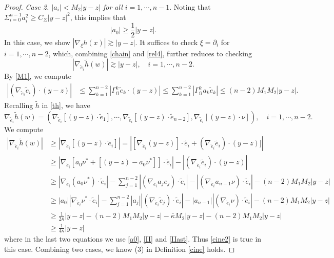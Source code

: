 \documentclass[11pt,a4paper,reqno]{amsart}
\newcommand{\1}{\mathbf{1}}
\numberwithin{equation}{section}
\theoremstyle{plain}
\theoremstyle{definition}
\theoremstyle{remark}
\begin{document}
\begin{proof}
\medskip
\emph{Case 2. $|a_i| < M_2|y-z|$ for all $i=1,\cdots, n-1$}. Noting that $\Sigma_{i=0}^{n-1}a_i^2 \ge C_\Sigma |y-z|^2$, this implies that
\begin{equation}\label{a0}
  |a_0| \ge \frac12|y-z|.
\end{equation}
In this case, we show $|\nabla_\xi h(x)|\gtrsim |y-z|$. It suffices to check $\xi = \partial_i$ for $i=1, \cdots, n-2$, which, combining \eqref{chain} and \eqref{rel4}, further reduces to checking
$$   |\nabla_{\tilde e_i} \tilde h(w)|\gtrsim |y-z|, \quad  i= 1, \cdots,  n-2.   $$
By \eqref{M1}, we compute
\begin{align*}
  |(\nabla_{\tilde e_i}\tilde e_i)\cdot (y-z)| & \le \sum_{k=1}^{n-2} |\Gamma_{ii}^k \tilde e_k \cdot  (y-z)| \le \sum_{k=1}^{n-2} |\Gamma_{ii}^k a_k \tilde e_k| \le (n-2)M_1M_2|y-z|.
\end{align*}
Recalling $\tilde h$ in \eqref{th},
we have
\begin{equation*}
\nabla_{\tilde e_i} \tilde h (w)= (\nabla_{\tilde e_i}[(y-z) \cdot \tilde e_1], \cdots, \nabla_{\tilde e_i}[(y-z) \cdot \tilde e_{n-2}], \nabla_{\tilde e_i}[ (y-z) \cdot\nu]), \quad i=1, \cdots, n-2.
\end{equation*}
We compute
\begin{align*}
  |\nabla_{\tilde e_i} \tilde h(w)| & \ge |\nabla_{\tilde e_i}[(y-z) \cdot \tilde e_i]| =|[\nabla_{\tilde e_i}(y-z)]\cdot \tilde e_i + (\nabla_{\tilde e_i}\tilde e_i)\cdot (y-z)]|  \\
   & \ge  |\nabla_{\tilde e_i}[a_0\nu^\ast+[(y-z)-a_0\nu^\ast]]\cdot \tilde e_i| - |(\nabla_{\tilde e_i}\tilde e_i)\cdot(y-z)| \\
   & \ge |\nabla_{\tilde e_i}(a_0\nu^\ast)\cdot  \tilde e_i| - \sum_{j=1}^{n-2}|(\nabla_{\tilde e_i}a_je_j) \cdot \tilde e_i|- |(\nabla_{\tilde e_i}a_{n-1}\nu) \cdot \tilde e_i| - (n-2)M_1M_2|y-z|\\
   & \ge |a_0||\nabla_{\tilde e_i}\nu^\ast \cdot \tilde e_i| - \sum_{j=1}^{n-2}|a_j||(\nabla_{\tilde e_i}\tilde e_j) \cdot \tilde e_i| -|a_{n-1}||(\nabla_{\tilde e_i}\nu) \cdot \tilde e_i| - (n-2)M_1M_2|y-z|  \\
   & \ge \frac{1}{2 \bar \kappa}|y-z| - (n-2)M_1M_2 |y-z|- \bar \kappa M_2 |y-z| -(n-2)M_1M_2|y-z| \\
   & \ge \frac{1}{4 \bar \kappa}|y-z|
\end{align*}
where in the last two equations we use \eqref{a0}, \eqref{II} and \eqref{IIast}.
Thus \eqref{cine2} is true in this case. Combining two cases, we know (3) in Definition \ref{cine} holds.





\end{proof}
\end{document}
